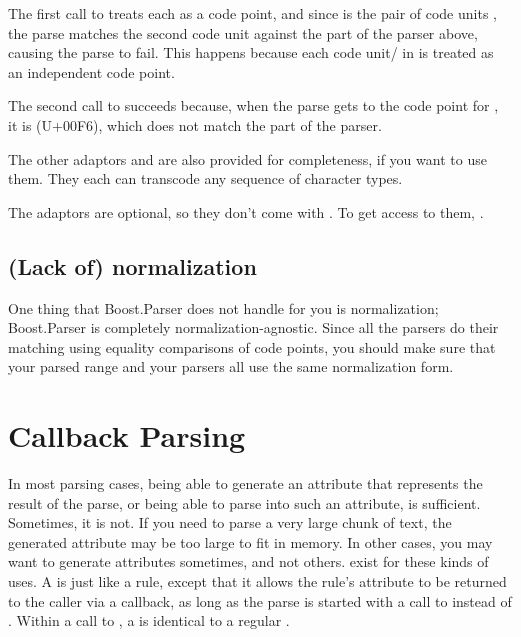 \documentclass{MyBook}
\begin{document}
The first call to  treats each  as a code point, and since  is the pair of code units  , the parse matches the second code unit against the  part of the parser above, causing the parse to fail. This happens because each code unit/ in  is treated as an independent code point.

The second call to  succeeds because, when the parse gets to the code point for , it is  (U+00F6), which does not match the  part of the parser.

The other adaptors  and  are also provided for completeness, if you want to use them. They each can transcode any sequence of character types.

\begin{marker}[title=Important ]
The  adaptors are optional, so they don't come with . To get access to them, . 
\end{marker}

\subsection{(Lack of) normalization}

One thing that Boost.Parser does not handle for you is normalization; Boost.Parser is completely normalization-agnostic. Since all the parsers do their matching using equality comparisons of code points, you should make sure that your parsed range and your parsers all use the same normalization form.

\section{Callback Parsing}

In most parsing cases, being able to generate an attribute that represents the result of the parse, or being able to parse into such an attribute, is sufficient. Sometimes, it is not. If you need to parse a very large chunk of text, the generated attribute may be too large to fit in memory. In other cases, you may want to generate attributes sometimes, and not others.  exist for these kinds of uses. A  is just like a rule, except that it allows the rule's attribute to be returned to the caller via a callback, as long as the parse is started with a call to  instead of . Within a call to , a  is identical to a regular .
\end{document}

